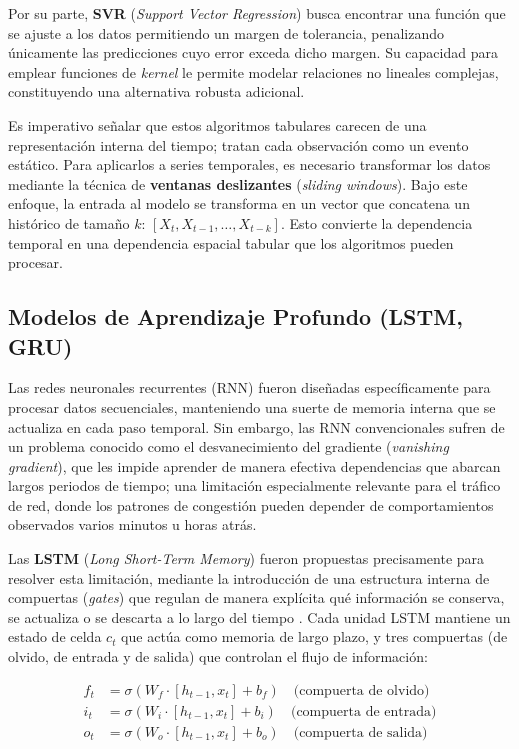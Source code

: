 \documentclass[12pt]{report}
\begin{document}
Por su parte, \textbf{SVR} (\textit{Support Vector Regression}) busca encontrar una función que se ajuste a los datos permitiendo un margen de tolerancia, penalizando únicamente las predicciones cuyo error exceda dicho margen. Su capacidad para emplear funciones de \textit{kernel} le permite modelar relaciones no lineales complejas, constituyendo una alternativa robusta adicional.

Es imperativo señalar que estos algoritmos tabulares carecen de una representación interna del tiempo; tratan cada observación como un evento estático. Para aplicarlos a series temporales, es necesario transformar los datos mediante la técnica de \textbf{ventanas deslizantes} (\textit{sliding windows}). Bajo este enfoque, la entrada al modelo se transforma en un vector que concatena un histórico de tamaño $k$: $[X_t, X_{t-1}, \dots, X_{t-k}]$. 
Esto convierte la dependencia temporal en una dependencia espacial tabular que los algoritmos pueden procesar.

\subsection{Modelos de Aprendizaje Profundo (LSTM, GRU)}
\label{subsec:deep_learning}

Las redes neuronales recurrentes (RNN) fueron diseñadas específicamente para procesar datos secuenciales, manteniendo una suerte de memoria interna que se actualiza en cada paso temporal. Sin embargo, las RNN convencionales sufren de un problema conocido como el desvanecimiento del gradiente (\textit{vanishing gradient}), que les impide aprender de manera efectiva dependencias que abarcan largos periodos de tiempo; una limitación 
especialmente relevante para el tráfico de red, donde los patrones de congestión pueden depender de comportamientos observados varios minutos u horas atrás.

Las \textbf{LSTM} (\textit{Long Short-Term Memory}) fueron propuestas precisamente para resolver esta limitación, mediante la introducción de una estructura interna de compuertas (\textit{gates}) que regulan de manera explícita qué información se conserva, se actualiza o se descarta a lo largo del tiempo \cite{hochreiter1997}. Cada unidad LSTM mantiene un estado de celda $c_t$ que actúa como memoria de largo plazo, y tres compuertas 
(de olvido, de entrada y de salida) que controlan el flujo de información:

\begin{align}
    f_t &= \sigma(W_f \cdot [h_{t-1}, x_t] + b_f) \quad \mbox{(compuerta de olvido)} \\
    i_t &= \sigma(W_i \cdot [h_{t-1}, x_t] + b_i) \quad \mbox{(compuerta de entrada)} \\
    o_t &= \sigma(W_o \cdot [h_{t-1}, x_t] + b_o) \quad \mbox{(compuerta de salida)}
    \label{eq:lstm_gates}
\end{align}
\end{document}
